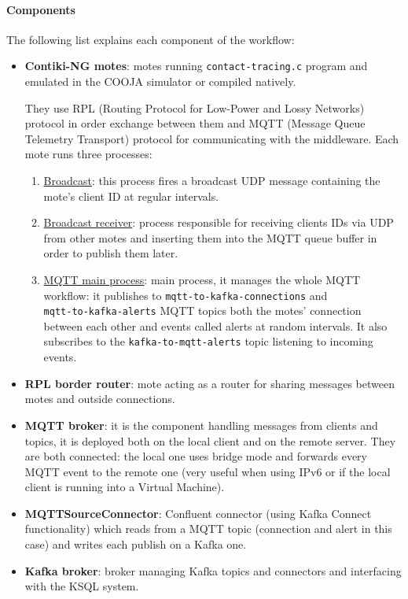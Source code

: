 \documentclass[table, 12pt]{article}
\begin{document}
\paragraph{Components}
The following list explains each component of the workflow:
\begin{itemize}
    \item \textbf{Contiki-NG motes}: motes running \texttt{contact-tracing.c} program and emulated in the COOJA simulator or compiled natively.

          They use RPL (Routing Protocol for Low-Power and Lossy Networks) protocol in order exchange between them and MQTT (Message Queue Telemetry Transport) protocol for communicating with the middleware.
          Each mote runs three processes:
          \begin{enumerate}
              \item \underline{Broadcast}: this process fires a broadcast UDP message containing the mote's client ID at regular intervals.
              \item \underline{Broadcast receiver}: process responsible for receiving clients IDs via UDP from other motes and inserting them into the MQTT queue buffer in order to publish them later.
              \item \underline{MQTT main process}: main process, it manages the whole MQTT workflow: it publishes to \texttt{mqtt-to-kafka-connections} and \\ \texttt{mqtt-to-kafka-alerts} MQTT topics both the motes' connection between each other and events called alerts at random intervals. It also subscribes to the \texttt{kafka-to-mqtt-alerts} topic listening to incoming events.
          \end{enumerate}
    \item \textbf{RPL border router}: mote acting as a router for sharing messages between motes and outside connections.
    \item \textbf{MQTT broker}: it is the component handling messages from clients and topics, it is deployed both on the local client and on the remote server. They are both connected: the local one uses bridge mode and forwards every MQTT event to the remote one (very useful when using IPv6 or if the local client is running into a Virtual Machine).
    \item \textbf{MQTTSourceConnector}: Confluent connector (using Kafka Connect functionality) which reads from a MQTT topic (connection and alert in this case) and writes each publish on a Kafka one.
    \item \textbf{Kafka broker}: broker managing Kafka topics and connectors and interfacing with the KSQL system.

\end{itemize}
\end{document}
